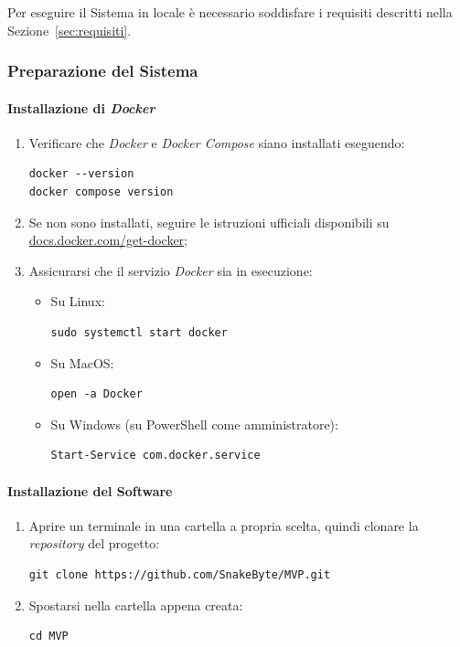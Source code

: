 \documentclass[10pt, letterpaper]{article}
\begin{document}
Per eseguire il Sistema in locale è necessario soddisfare i requisiti descritti nella Sezione~\ref{sec:requisiti}.

\subsubsection{Preparazione del Sistema}

\paragraph{Installazione di \textit{Docker}}

\begin{enumerate}
    \item Verificare che \textit{Docker} e \textit{Docker Compose} siano installati eseguendo:
\begin{verbatim}
docker --version
docker compose version
\end{verbatim}
    \item Se non sono installati, seguire le istruzioni ufficiali disponibili su \href{https://docs.docker.com/get-docker/}{docs.docker.com/get-docker};
    \item Assicurarsi che il servizio \textit{Docker} sia in esecuzione:
    \begin{itemize}
      \item Su Linux: \begin{verbatim}sudo systemctl start docker\end{verbatim}
      \item Su MacOS: \begin{verbatim}open -a Docker\end{verbatim}
      \item Su Windows (su PowerShell come amministratore): \begin{verbatim}Start-Service com.docker.service\end{verbatim}
\end{itemize}
\end{enumerate}

\paragraph{Installazione del Software}

\begin{enumerate}
    \item Aprire un terminale in una cartella a propria scelta, quindi clonare 
    la \textit{repository} del progetto:
\begin{verbatim}
git clone https://github.com/SnakeByte/MVP.git
\end{verbatim}
    \item Spostarsi nella cartella appena creata:
\begin{verbatim}
cd MVP
\end{verbatim}
\end{enumerate}
\end{document}
